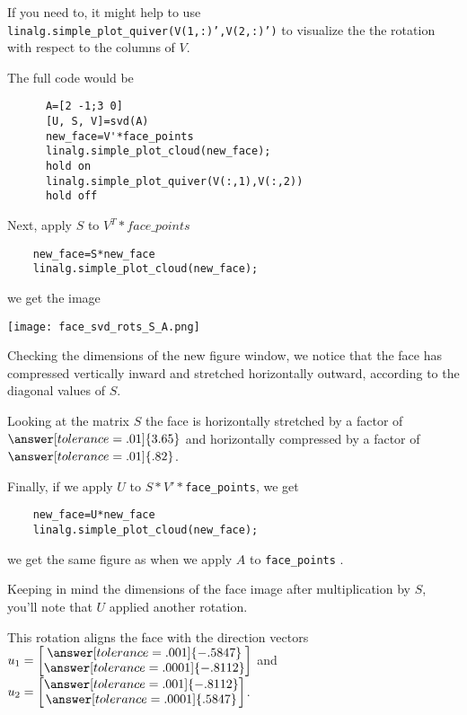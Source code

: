 \documentclass{ximera}
\begin{document}
\begin{problem}
  \begin{feedback}
    If you need to, it might help to use \texttt{linalg.simple\_plot\_quiver(V(1,:)',V(2,:)')} to visualize the the rotation with respect to the columns of $V$.

    The full code would be


    \begin{verbatim}
      A=[2 -1;3 0]
      [U, S, V]=svd(A)
      new_face=V'*face_points
      linalg.simple_plot_cloud(new_face);
      hold on
      linalg.simple_plot_quiver(V(:,1),V(:,2))
      hold off
    \end{verbatim}
  \end{feedback}

  
  Next, apply $S$ to $V^T*face\_points$

  \begin{verbatim}
    new_face=S*new_face
    linalg.simple_plot_cloud(new_face);
  \end{verbatim}

  we get the image

    \begin{center}
      \texttt{[image: face\_svd\_rots\_S\_A.png]}
    \end{center}

  Checking the dimensions of the new figure window, we notice that the face has compressed vertically inward and stretched horizontally outward, according to the diagonal values of $S$.

  Looking at the matrix $S$ the face is horizontally stretched by a factor of $\answer[tolerance=.01]{3.65}$ and horizontally compressed by a factor of $\answer[tolerance=.01]{.82}$.

  Finally, if we apply $U$ to $S*V'*$\texttt{face\_points}, we get 

  \begin{verbatim}
    new_face=U*new_face
    linalg.simple_plot_cloud(new_face);
  \end{verbatim}

  we get the same figure as when we apply $A$ to \texttt{face\_points} . 

  Keeping in mind the dimensions of the face image after multiplication by $S$, you'll note that $U$ applied another rotation. 

  This rotation aligns the face with the direction vectors $u_1=\begin{bmatrix}\answer[tolerance=.001]{-.5847}\\\answer[tolerance=.0001]{-.8112}\end{bmatrix}$ and $u_2=\begin{bmatrix}\answer[tolerance=.001]{-.8112}\\\answer[tolerance=.0001]{.5847}\end{bmatrix}$.



\end{problem}
\end{document}
